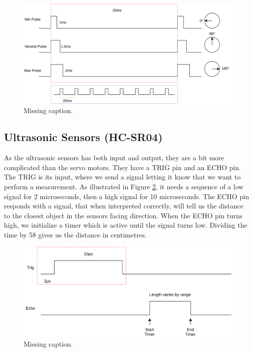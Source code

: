 \documentclass{article}
\begin{document}
\begin{figure}[H]
	\centering
	\includegraphics[width=\linewidth]{servo.png}
	\caption{Missing caption.}
	\label{servo}
\end{figure}

\subsection{Ultrasonic Sensors (HC-SR04)}
As the ultrasonic sensors has both input and output, they are a bit more complicated than the servo motors. They have a TRIG pin and an ECHO pin.\\ 

The TRIG is its input, where we send a signal letting it know that we want to perform a measurement. As illustrated in Figure \ref{ultrasonic-sensor}, it needs a sequence of a low signal for 2 microseconds, then a high signal for 10 microseconds. The ECHO pin responds with a signal, that when interpreted correctly, will tell us the distance to the closest object in the sensors facing direction. When the ECHO pin turns high, we initialize a timer which is active until the signal turns low. Dividing the time by 58 gives us the distance in centimetres.\\

\begin{figure}[H]
	\centering
	\includegraphics[width=\linewidth]{ultrasonic-sensor.png}
	\caption{Missing caption.}
	\label{ultrasonic-sensor}
\end{figure}
\end{document}
